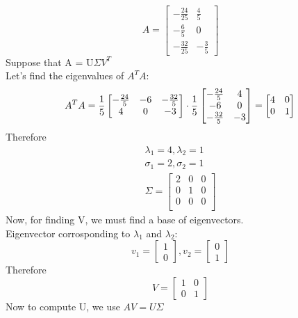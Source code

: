 \documentclass{article}
\begin{document}
	\section{}
	\[
	A=
	\begin{bmatrix}
	-\frac{24}{25} & \frac{4}{5} \\
	-\frac{6}{5} & 0 \\
	-\frac{32}{25} & -\frac{3}{5}
	\end{bmatrix}
	\]
	Suppose that A = U$\Sigma V^{T}$ \\
	Let's find the eigenvalues of $A^{T}A$:
	\[	
	A^{T}A =
	\frac{1}{5}
	\begin{bmatrix}
	-\frac{24}{5} & -6 & -\frac{32}{5} \\
	4 & 0 & -3
	\end{bmatrix}
	\cdot
	\frac{1}{5}
	\begin{bmatrix}
	-\frac{24}{5} & 4 \\
	-6 & 0 \\
	-\frac{32}{5} & -3
	\end{bmatrix}
	=
	\begin{bmatrix}
	4 & 0 \\
	0 & 1
	\end{bmatrix}\\
	\]
	Therefore\\
	\[
	\begin{split}
	\lambda_{1}=4,\lambda_{2}=1 \\
	\sigma_{1}=2, \sigma_{2}=1 \\
	\Sigma = 
	\begin{bmatrix}
	2 & 0 & 0 \\
	0 & 1 & 0 \\ 
	0 & 0 & 0 \\
	\end{bmatrix}	
	\end{split}
	\]
	Now, for finding V, we must find a base of eigenvectors.\\
	Eigenvector corrosponding to $\lambda_{1}$ and $\lambda_{2}:$
	\[
	v_{1}=\begin{bmatrix}
	1\\
	0
	\end{bmatrix},
	v_{2}=\begin{bmatrix}
	0\\
	1
	\end{bmatrix}
	\]
	Therefore
	\[
	V=\begin{bmatrix}
	1 & 0 \\
	0 & 1
	\end{bmatrix}
	\]
	Now to compute U, we use $AV=U\Sigma$
\end{document}
